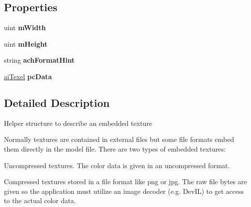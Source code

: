 \subsection*{Properties}
\begin{DoxyCompactItemize}
\item 
\hypertarget{structai_texture_a651cb5bf623ea9a38934993e3e723918}{uint {\bfseries m\+Width}}\label{structai_texture_a651cb5bf623ea9a38934993e3e723918}

\item 
\hypertarget{structai_texture_a08e52b4a33865d68ad567f7a3cafe029}{uint {\bfseries m\+Height}}\label{structai_texture_a08e52b4a33865d68ad567f7a3cafe029}

\item 
\hypertarget{structai_texture_a0a972b88c102d08098eeb5023870ba87}{string {\bfseries ach\+Format\+Hint}}\label{structai_texture_a0a972b88c102d08098eeb5023870ba87}

\item 
\hypertarget{structai_texture_a48a50a2455690754ccf6b9614fbf65d6}{\hyperlink{structai_texel}{ai\+Texel} {\bfseries pc\+Data}}\label{structai_texture_a48a50a2455690754ccf6b9614fbf65d6}

\end{DoxyCompactItemize}


\subsection{Detailed Description}
Helper structure to describe an embedded texture

Normally textures are contained in external files but some file formats embed them directly in the model file. There are two types of embedded textures\+:
\begin{DoxyEnumerate}
\item Uncompressed textures. The color data is given in an uncompressed format.
\item Compressed textures stored in a file format like png or jpg. The raw file bytes are given so the application must utilize an image decoder (e.\+g. Dev\+I\+L) to get access to the actual color data. 
\end{DoxyEnumerate}

